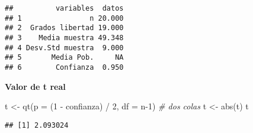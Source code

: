 \documentclass[
]{article}
\newenvironment{Shaded}{\begin{snugshade}}{\end{snugshade}}
\newcommand{\AttributeTok}[1]{\textcolor[rgb]{0.77,0.63,0.00}{#1}}
\newcommand{\CommentTok}[1]{\textcolor[rgb]{0.56,0.35,0.01}{\textit{#1}}}
\newcommand{\DecValTok}[1]{\textcolor[rgb]{0.00,0.00,0.81}{#1}}
\newcommand{\FunctionTok}[1]{\textcolor[rgb]{0.00,0.00,0.00}{#1}}
\newcommand{\NormalTok}[1]{#1}
\newcommand{\OtherTok}[1]{\textcolor[rgb]{0.56,0.35,0.01}{#1}}
\newcommand{\SpecialCharTok}[1]{\textcolor[rgb]{0.00,0.00,0.00}{#1}}
\begin{document}
\begin{verbatim}
##          variables  datos
## 1                n 20.000
## 2  Grados libertad 19.000
## 3    Media muestra 49.348
## 4 Desv.Std muestra  9.000
## 5       Media Pob.     NA
## 6        Confianza  0.950
\end{verbatim}

\textbf{Valor de t real}

\begin{Shaded}
\begin{Highlighting}[]
\NormalTok{t }\OtherTok{\textless{}{-}} \FunctionTok{qt}\NormalTok{(}\AttributeTok{p =}\NormalTok{ (}\DecValTok{1} \SpecialCharTok{{-}}\NormalTok{ confianza) }\SpecialCharTok{/} \DecValTok{2}\NormalTok{, }\AttributeTok{df =}\NormalTok{ n}\DecValTok{{-}1}\NormalTok{) }\CommentTok{\# dos colas}
\NormalTok{t }\OtherTok{\textless{}{-}} \FunctionTok{abs}\NormalTok{(t)}
\NormalTok{t}
\end{Highlighting}
\end{Shaded}

\begin{verbatim}
## [1] 2.093024
\end{verbatim}
\end{document}
